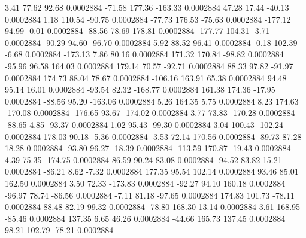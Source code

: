         3.41       77.62       92.68     0.0002884
      -71.58      177.36     -163.33     0.0002884
       47.28       17.44      -40.13     0.0002884
        1.18      110.54      -90.75     0.0002884
      -77.73      176.53      -75.63     0.0002884
     -177.12       94.99       -0.01     0.0002884
      -88.56       78.69      178.81     0.0002884
     -177.77      104.31       -3.71     0.0002884
      -90.29       94.60      -96.70     0.0002884
        5.92       88.52       96.41     0.0002884
       -0.18      102.39       -6.68     0.0002884
     -173.13        7.86       80.16     0.0002884
      171.32      170.84      -98.82     0.0002884
      -95.96       96.58      164.03     0.0002884
      179.14       70.57      -92.71     0.0002884
       88.33       97.82      -91.97     0.0002884
      174.73       88.04       78.67     0.0002884
     -106.16      163.91       65.38     0.0002884
       94.48       95.14       16.01     0.0002884
      -93.54       82.32     -168.77     0.0002884
      161.38      174.36      -17.95     0.0002884
      -88.56       95.20     -163.06     0.0002884
        5.26      164.35        5.75     0.0002884
        8.23      174.63     -170.08     0.0002884
     -176.65       93.67     -174.02     0.0002884
        3.77       73.83     -170.28     0.0002884
      -88.65        4.85      -93.37     0.0002884
        1.02       95.43      -99.30     0.0002884
        3.04      100.43     -102.24     0.0002884
      178.03       90.18       -5.36     0.0002884
       -3.53       72.14      170.56     0.0002884
      -89.73       87.28       18.28     0.0002884
      -93.80       96.27      -18.39     0.0002884
     -113.59      170.87      -19.43     0.0002884
        4.39       75.35     -174.75     0.0002884
       86.59       90.24       83.08     0.0002884
      -94.52       83.82       15.21     0.0002884
      -86.21        8.62       -7.32     0.0002884
      177.35       95.54      102.14     0.0002884
       93.46       85.01      162.50     0.0002884
        3.50       72.33     -173.83     0.0002884
      -92.27       94.10      160.18     0.0002884
      -96.97       78.74      -86.56     0.0002884
       -7.11       81.18      -97.65     0.0002884
      174.83      101.73      -78.11     0.0002884
       88.48       82.19       99.32     0.0002884
      -78.80      168.30       13.14     0.0002884
        3.61      168.95      -85.46     0.0002884
      137.35        6.65       46.26     0.0002884
      -44.66      165.73      137.45     0.0002884
       98.21      102.79      -78.21     0.0002884
